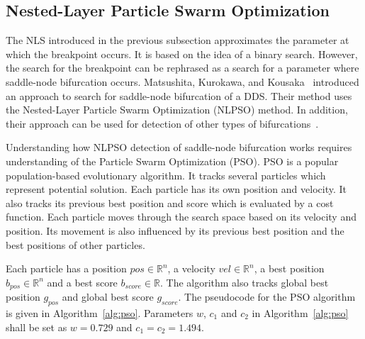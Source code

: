 \subsection{Nested-Layer Particle Swarm Optimization}
The NLS introduced in the previous subsection approximates the parameter at which the breakpoint occurs.
It is based on the idea of a binary search.
However, the search for the breakpoint can be rephrased as a search for a parameter where saddle-node bifurcation occurs.
Matsushita, Kurokawa, and Kousaka~\cite{Matsushita2019} introduced an approach to search for saddle-node bifurcation of a DDS.
Their method uses the Nested-Layer Particle Swarm Optimization (NLPSO) method.
In addition, their approach can be used for detection of other types of bifurcations~\cite{Matsushita20170721}.
\par
Understanding how NLPSO detection of saddle-node bifurcation works requires understanding of the Particle Swarm Optimization (PSO).
PSO is a popular population-based evolutionary algorithm.
It tracks several particles which represent potential solution.
Each particle has its own position and velocity. It also tracks its previous best position and score which is evaluated by a cost function.
Each particle moves through the search space based on its velocity and position.
Its movement is also influenced by its previous best position and the best positions of other particles.~\cite{Matsushita2019}
\par
Each particle has a position $pos \in \mathbb{R}^{n}$, a velocity $vel \in \mathbb{R}^{n}$, a best position $b_{pos} \in \mathbb{R}^{n}$ and a best score $b_{score} \in \mathbb{R}$.
The algorithm also tracks global best position $g_{pos}$ and global best score $g_{score}$.
The pseudocode for the PSO algorithm is given in Algorithm~\ref{alg:pso}.
Parameters $w$, $c_{1}$ and $c_{2}$ in Algorithm~\ref{alg:pso} shall be set as $w=0.729$ and $c_{1}=c_{2}=1.494$.~\cite{Matsushita2019}

